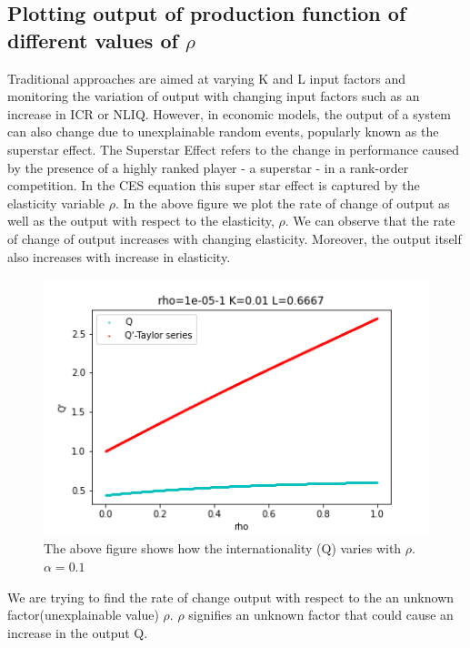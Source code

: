 \documentclass{article}
\begin{document}
\subsection{Plotting output of production function of different values of $\rho$}
Traditional approaches are aimed at varying K and L input factors and monitoring the variation of output with changing input factors such as an increase in ICR or NLIQ. However, in economic models, the output of a system can also change due to unexplainable random events, popularly known as the superstar effect. The Superstar Effect refers to the change in performance caused by the presence of a highly ranked player - a superstar - in a rank-order competition. In the CES equation this super star effect is captured by the elasticity variable $\rho$. In the above figure we plot the rate of change of output as well as the output with respect to the elasticity, $\rho$. We can observe that the rate of change of output increases with changing elasticity. Moreover, the output itself also increases with increase in elasticity.\\


\begin{figure}[h]
    \centering
    \includegraphics[scale=0.5]{images/0.01-0.67.png}
    \caption{The above figure shows how the internationality (Q) varies with $\rho$. $\alpha=0.1$}
    \label{fig:my_label}
\end{figure}

We are trying to find the rate of change output with respect to the an unknown factor(unexplainable value) $\rho$. $\rho$ signifies an unknown factor that could cause an increase in the output Q.
\end{document}
